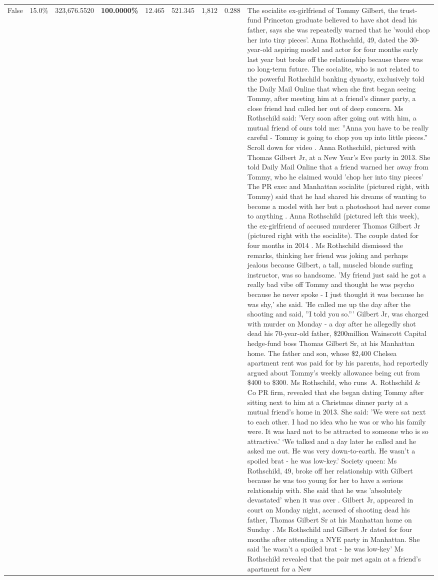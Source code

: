\begin{table}[H]
\begin{tabular}{lllrlllll}
False & 15.0\% & 323,676.5520 & \bfseries \color{red} 100.0000\% & 12.465 & 521.345 & 1,812 & 0.288 & The socialite ex-girlfriend of Tommy Gilbert, the trust-fund Princeton graduate believed to have shot dead his father, says she was repeatedly warned that he 'would chop her into tiny pieces'. Anna Rothschild, 49, dated the 30-year-old aspiring model and actor for four months early last year but broke off the relationship because there was no long-term future. The socialite, who is not related to the powerful Rothschild banking dynasty, exclusively told the Daily Mail Online that when she first began seeing Tommy, after meeting him at a friend's dinner party, a close friend had called her out of deep concern. Ms Rothschild said: 'Very soon after going out with him, a mutual friend of ours told me: ''Anna you have to be really careful - Tommy is going to chop you up into little pieces.'' Scroll down for video . Anna Rothschild, pictured with Thomas Gilbert Jr, at a New Year's Eve party in 2013. She told Daily Mail Online that a friend warned her away from Tommy, who he claimed would 'chop her into tiny pieces' The PR exec and Manhattan socialite (pictured right, with Tommy) said that he had shared his dreams of wanting to become a model with her but a photoshoot had never come to anything . Anna Rothschild (pictured left this week), the ex-girlfriend of accused murderer Thomas Gilbert Jr (pictured right with the socialite). The couple dated for four months in 2014 . Ms Rothschild dismissed the remarks, thinking her friend was joking and perhaps jealous because Gilbert, a tall, muscled blonde surfing instructor, was so handsome. 'My friend just said he got a really bad vibe off Tommy and thought he was psycho because he never spoke - I just thought it was because he was shy,' she said. 'He called me up the day after the shooting and said, ''I told you so.''' Gilbert Jr, was charged with murder on Monday - a day after he allegedly shot dead his 70-year-old father, \$200million Wainscott Capital hedge-fund boss Thomas Gilbert Sr, at his Manhattan home. The father and son, whose \$2,400 Chelsea apartment rent was paid for by his parents, had reportedly argued about Tommy's weekly allowance being cut from \$400 to \$300. Ms Rothschild, who runs A. Rothschild \& Co PR firm, revealed that she began dating Tommy after sitting next to him at a Christmas dinner party at a mutual friend's home in 2013. She said: 'We were sat next to each other. I had no idea who he was or who his family were. It was hard not to be attracted to someone who is so attractive.' ‘We talked and a day later he called and he asked me out. He was very down-to-earth. He wasn’t a spoiled brat - he was low-key.’ Society queen: Ms Rothschild, 49, broke off her relationship with Gilbert because he was too young for her to have a serious relationship with. She said that he was 'absolutely devastated' when it was over . Gilbert Jr, appeared in court on Monday night, accused of shooting dead his father, Thomas Gilbert Sr at his Manhattan home on Sunday . Ms Rothschild and Gilbert Jr dated for four months after attending a NYE party in Manhattan. She said 'he wasn't a spoiled brat - he was low-key' Ms Rothschild revealed that the pair met again at a friend’s apartment for a New 
\end{tabular}
\end{table}

